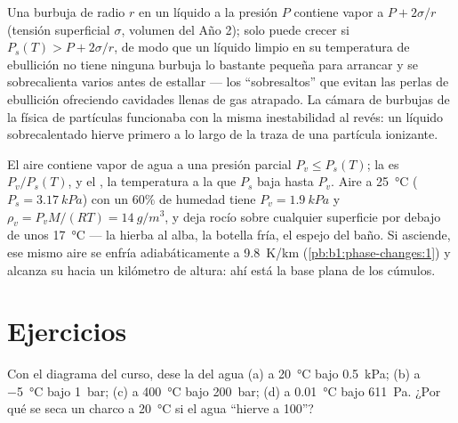 \begin{remark}\label{rem:b1:phase-changes:nucleation}
Una burbuja de radio $r$ en un líquido a la presión $P$ contiene vapor a
$P + 2\sigma/r$ (tensión superficial $\sigma$, volumen del Año 2); solo
puede crecer si $P_s(T) > P + 2\sigma/r$, de modo que un líquido limpio en
su temperatura de ebullición no tiene ninguna burbuja lo bastante pequeña
para arrancar y se sobrecalienta varios  antes de estallar --- los
``sobresaltos'' que evitan las perlas de ebullición ofreciendo cavidades
llenas de gas atrapado. La cámara de burbujas de la física de partículas
funcionaba con la misma inestabilidad al revés: un líquido
sobrecalentado hierve primero a lo largo de la traza de una partícula ionizante.
\end{remark}

\begin{example}\label{ex:b1:phase-changes:dew}
El aire contiene vapor de agua a una presión parcial $P_v \leq P_s(T)$; la
\emph{} es $P_v/P_s(T)$, y el \emph{}, la
temperatura a la que $P_s$ baja hasta $P_v$. Aire a \qty{25}{\degreeCelsius}
($P_s = \qty{3.17}{kPa}$) con un $60\%$ de humedad tiene $P_v = \qty{1.9}{kPa}$
y $\rho_v = P_vM/(RT) = \qty{14}{g/m^3}$, y deja rocío sobre cualquier
superficie por debajo de unos \qty{17}{\degreeCelsius} --- la hierba al
alba, la botella fría, el espejo del baño. Si asciende, ese mismo aire se
enfría adiabáticamente a \qty{9.8}{K/km} (\cref{pb:b1:phase-changes:1}) y
alcanza su  hacia un kilómetro de altura: ahí está la base
plana de los cúmulos.
\end{example}

\section{Ejercicios}

\begin{exercise}[$\star$]\label{exo:b1:phase-changes:1}
Con el diagrama del curso, dese la  del agua (a) a
\qty{20}{\degreeCelsius} bajo \qty{0.5}{kPa}; (b) a \qty{-5}{\degreeCelsius}
bajo \qty{1}{bar}; (c) a \qty{400}{\degreeCelsius} bajo \qty{200}{bar};
(d) a \qty{0.01}{\degreeCelsius} bajo \qty{611}{Pa}. ¿Por qué se seca un
charco a \qty{20}{\degreeCelsius} si el agua ``hierve a 100''?
\end{exercise}

